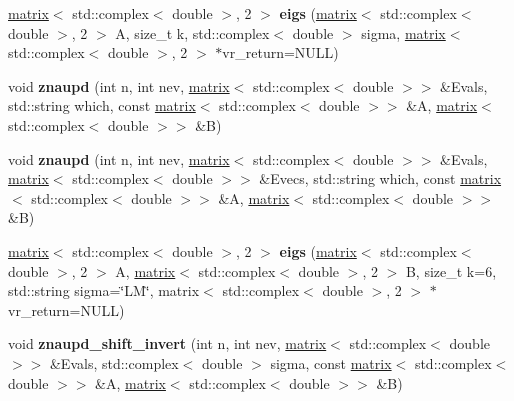 \begin{DoxyCompactItemize}
\item 
\hypertarget{namespacekeycpp_a2f4ae58835279838a816efea3568e221}{\hyperlink{classkeycpp_1_1matrix}{matrix}$<$ std\-::complex$<$ double $>$, 2 $>$ {\bfseries eigs} (\hyperlink{classkeycpp_1_1matrix}{matrix}$<$ std\-::complex$<$ double $>$, 2 $>$ A, size\-\_\-t k, std\-::complex$<$ double $>$ sigma, \hyperlink{classkeycpp_1_1matrix}{matrix}$<$ std\-::complex$<$ double $>$, 2 $>$ $\ast$vr\-\_\-return=N\-U\-L\-L)}\label{namespacekeycpp_a2f4ae58835279838a816efea3568e221}

\item 
\hypertarget{namespacekeycpp_abee2fba02e36cee19c4731696b17db50}{void {\bfseries znaupd} (int n, int nev, \hyperlink{classkeycpp_1_1matrix}{matrix}$<$ std\-::complex$<$ double $>$$>$ \&Evals, std\-::string which, const \hyperlink{classkeycpp_1_1matrix}{matrix}$<$ std\-::complex$<$ double $>$$>$ \&A, \hyperlink{classkeycpp_1_1matrix}{matrix}$<$ std\-::complex$<$ double $>$$>$ \&B)}\label{namespacekeycpp_abee2fba02e36cee19c4731696b17db50}

\item 
\hypertarget{namespacekeycpp_ad82232bc5f219be9ffc4313d29755465}{void {\bfseries znaupd} (int n, int nev, \hyperlink{classkeycpp_1_1matrix}{matrix}$<$ std\-::complex$<$ double $>$$>$ \&Evals, \hyperlink{classkeycpp_1_1matrix}{matrix}$<$ std\-::complex$<$ double $>$$>$ \&Evecs, std\-::string which, const \hyperlink{classkeycpp_1_1matrix}{matrix}$<$ std\-::complex$<$ double $>$$>$ \&A, \hyperlink{classkeycpp_1_1matrix}{matrix}$<$ std\-::complex$<$ double $>$$>$ \&B)}\label{namespacekeycpp_ad82232bc5f219be9ffc4313d29755465}

\item 
\hypertarget{namespacekeycpp_ab5e47ab53db5cd76c38c2f561903f4a7}{\hyperlink{classkeycpp_1_1matrix}{matrix}$<$ std\-::complex$<$ double $>$, 2 $>$ {\bfseries eigs} (\hyperlink{classkeycpp_1_1matrix}{matrix}$<$ std\-::complex$<$ double $>$, 2 $>$ A, \hyperlink{classkeycpp_1_1matrix}{matrix}$<$ std\-::complex$<$ double $>$, 2 $>$ B, size\-\_\-t k=6, std\-::string sigma=\char`\"{}L\-M\char`\"{}, matrix$<$ std\-::complex$<$ double $>$, 2 $>$ $\ast$vr\-\_\-return=N\-U\-L\-L)}\label{namespacekeycpp_ab5e47ab53db5cd76c38c2f561903f4a7}

\item 
\hypertarget{namespacekeycpp_a451ee1ae5c27500a4a1b7a4b351352d1}{void {\bfseries znaupd\-\_\-shift\-\_\-invert} (int n, int nev, \hyperlink{classkeycpp_1_1matrix}{matrix}$<$ std\-::complex$<$ double $>$$>$ \&Evals, std\-::complex$<$ double $>$ sigma, const \hyperlink{classkeycpp_1_1matrix}{matrix}$<$ std\-::complex$<$ double $>$$>$ \&A, \hyperlink{classkeycpp_1_1matrix}{matrix}$<$ std\-::complex$<$ double $>$$>$ \&B)}\label{namespacekeycpp_a451ee1ae5c27500a4a1b7a4b351352d1}


\end{DoxyCompactItemize}
